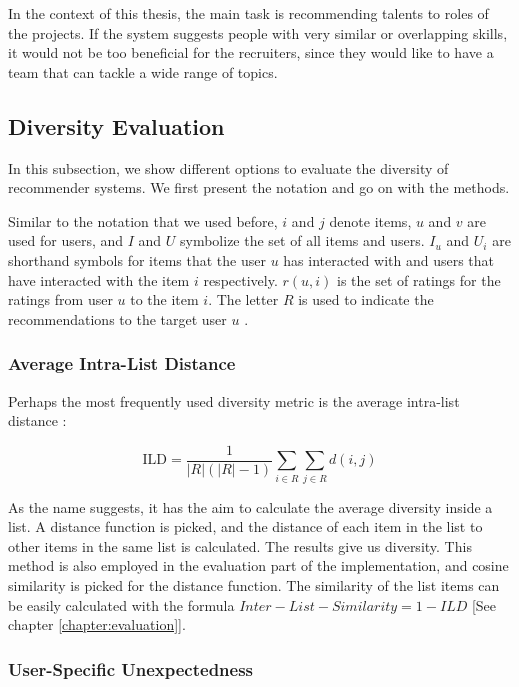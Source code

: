 In the context of this thesis, the main task is recommending talents to roles of the projects. If the system suggests people with very similar or overlapping skills, it would not be too beneficial for the recruiters, since they would like to have a team that can tackle a wide range of topics.

\subsection{Diversity Evaluation}

In this subsection, we show different options to evaluate the diversity of recommender systems. We first present the notation and go on with the methods.

Similar to the notation that we used before, $i$ and $j$ denote items, $u$ and $v$ are used for users, and $I$ and $U$ symbolize the set of all items and users. $I_u$ and $U_i$ are shorthand symbols for items that the user $u$ has interacted with and users that have interacted with the item $i$ respectively. $r (u, i )$ is the set of ratings for the ratings from user $u$ to the item $i$. The letter $R$ is used to indicate the recommendations to the target user $u$ \cite{castells2015novelty}.

\subsubsection{Average Intra-List Distance}

Perhaps the most frequently used diversity metric is the average intra-list distance \cite{castells2015novelty}: 

$$\mathrm { ILD } = \frac { 1 } { | R | ( | R | - 1 ) } \sum _ { i \in R } \sum _ { j \in R } d ( i , j )$$


As the name suggests, it has the aim to calculate the average diversity inside a list. A distance function is picked, and the distance of each item in the list to other items in the same list is calculated. The results give us diversity. This method is also employed in the evaluation part of the implementation, and cosine similarity is picked for the distance function. The similarity of the list items can be easily calculated with the formula $Inter-List-Similarity = 1 - ILD$ [See chapter \ref{chapter:evaluation}].


\subsubsection{User-Specific Unexpectedness}

